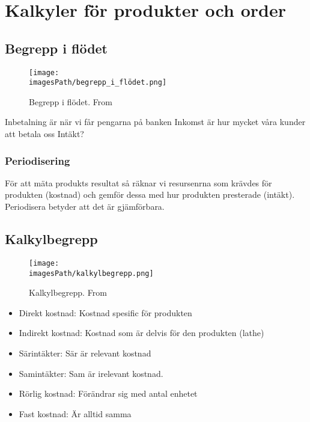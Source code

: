 %
%
%
%

\section{Kalkyler för produkter och order}
\subsection{Begrepp i flödet}
\begin{figure}[!ht]
    \centering
    \texttt{[image: \\imagesPath/begrepp\_i\_flödet.png]}
    \caption{Begrepp i flödet. From \cite{}}
\end{figure}

Inbetalning är när vi får pengarna på banken 
Inkomst är hur mycket våra kunder att betala oss 
Intäkt?

\subsubsection{Periodisering}
För att mäta produkts resultat så räknar vi resursenrna som krävdes för produkten 
(kostnad) och gemför dessa med hur produkten presterade (intäkt).
Periodisera betyder att det är gjämförbara. 

\subsection{Kalkylbegrepp}
\begin{figure}[!ht]
    \centering
    \texttt{[image: \\imagesPath/kalkylbegrepp.png]}
    \caption{Kalkylbegrepp. From \cite{}}
\end{figure}
\begin{itemize}
    \item Direkt kostnad: Kostnad spesific för produkten
    \item Indirekt kostnad: Kostnad som är delvis för den produkten (lathe)
    \item Särintäkter: Sär är relevant kostnad 
    \item Samintäkter: Sam är irelevant kostnad.  
    \item Rörlig kostnad: Förändrar sig med antal enhetet
    \item Fast kostnad: Är alltid samma
\end{itemize}


